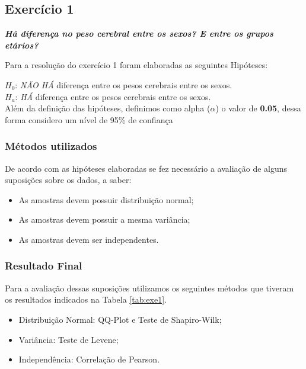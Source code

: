 \documentclass[12pt, a4paper]{article}
\begin{document}
    \subsection{Exercício 1} \label{exercicio_1}
    \textbf{\textit{Há diferença no peso cerebral entre os sexos? E entre os grupos etários?}}
    
    Para a resolução do exercício 1 foram elaboradas as seguintes Hipóteses:
    
    $H_{0}$: \textit{NÃO HÁ} diferença entre os pesos cerebrais entre os sexos.\\
    $H_{a}$: \textit{HÁ} diferença entre os pesos cerebrais entre os sexos.\\
    
    Além da definição das hipóteses, definimos como alpha ($\alpha$) o valor de  \textbf{0.05}, dessa forma considero um nível de 95\% de confiança
    
    \subsubsection{Métodos utilizados}
    De acordo com as hipóteses elaboradas se fez necessário a avaliação de alguns suposições sobre os dados, a saber:
    
    \begin{itemize}
        \item As amostras devem possuir distribuição normal;
        \item As amostras devem possuir a mesma variância;
        \item As amostras devem ser independentes.
    \end{itemize}
    
    \subsubsection{Resultado Final}
    Para a avaliação dessas suposições utilizamos os seguintes métodos que tiveram os resultados indicados na Tabela \ref{tab:exe1}.\\
    
    \begin{itemize}
        \item Distribuição Normal: QQ-Plot e Teste de Shapiro-Wilk;
        \item Variância: Teste de Levene;
        \item Independência: Correlação de Pearson.
    \end{itemize}
    \break
    
\end{document}

